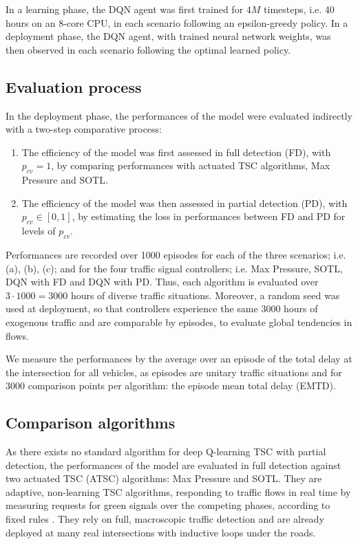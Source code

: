 \documentclass[journal]{IEEEtran}
\begin{document}
In a learning phase, the DQN agent was first trained for $4M$ timesteps, i.e. 40 hours on an 8-core CPU, in each scenario following an epsilon-greedy policy. In a deployment phase, the DQN agent, with trained neural network weights, was then observed in each scenario following the optimal learned policy.

\subsection{Evaluation process}

In the deployment phase, the performances of the model were evaluated indirectly with a two-step comparative process:
\begin{enumerate}
  \item The efficiency of the model was first assessed in full detection (FD), with $p_{cv} = 1$, by comparing performances with actuated TSC algorithms, Max Pressure and SOTL.
  \item The efficiency of the model was then assessed in partial detection (PD), with $p_{cv} \in [0,1]$, by estimating the loss in performances between FD and PD for levels of $p_{cv}$.
\end{enumerate}

Performances are recorded over 1000 episodes for each of the three scenarios; i.e. (a), (b), (c); and for the four traffic signal controllers; i.e. Max Pressure, SOTL, DQN with FD and DQN with PD. Thus, each algorithm is evaluated over $3 \cdot 1000 = 3000$ hours of diverse traffic situations. Moreover, a random seed was used at deployment, so that controllers experience the same $3000$ hours of exogenous traffic and are comparable by episodes, to evaluate global tendencies in flows.

We measure the performances by the average over an episode of the total delay at the intersection for all vehicles, as episodes are unitary traffic situations and for $3000$ comparison points per algorithm: the episode mean total delay (EMTD).

\subsection{Comparison algorithms}

As there exists no standard algorithm for deep Q-learning TSC with partial detection, the performances of the model are evaluated in full detection against two actuated TSC (ATSC) algorithms: Max Pressure and SOTL. They are adaptive, non-learning TSC algorithms, responding to traffic flows in real time by measuring requests for green signals over the competing phases, according to fixed rules \cite{wei2020survey}. They rely on full, macroscopic traffic detection and are already deployed at many real intersections with inductive loops under the roads.
\\
\end{document}
